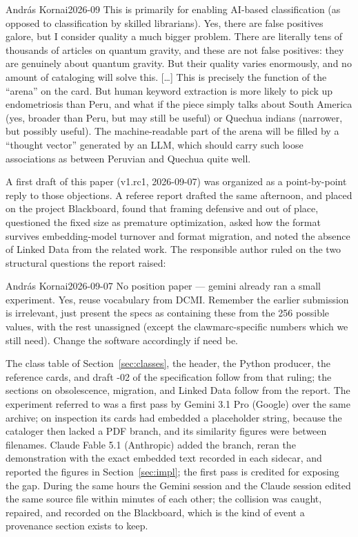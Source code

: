\documentclass[11pt]{article}
\begin{document}
\begin{seniorquote}{Andr\'as Kornai}{2026-09}
This is primarily for enabling AI-based classification (as opposed to
classification by skilled librarians). Yes, there are false positives galore,
but I consider quality a much bigger problem. There are literally tens of
thousands of articles on quantum gravity, and these are not false positives:
they are genuinely about quantum gravity. But their quality varies enormously,
and no amount of cataloging will solve this. [\dots] This is precisely the
function of the ``arena'' on the card. But human keyword extraction is more
likely to pick up endometriosis than Peru, and what if the piece simply talks
about South America (yes, broader than Peru, but may still be useful) or
Quechua indians (narrower, but possibly useful). The machine-readable part of
the arena will be filled by a ``thought vector'' generated by an LLM, which
should carry such loose associations as between Peruvian and Quechua quite
well.
\end{seniorquote}

\noindent
A first draft of this paper (v1.rc1, 2026-09-07) was organized as a
point-by-point reply to those objections. A referee report drafted the same
afternoon, and placed on the project Blackboard, found that framing defensive
and out of place, questioned the fixed size as premature optimization, asked
how the format survives embedding-model turnover and format migration, and
noted the absence of Linked Data from the related work. The responsible
author ruled on the two structural questions the report raised:

\begin{seniorquote}{Andr\'as Kornai}{2026-09-07}
No position paper --- gemini already ran a small experiment. Yes, reuse
vocabulary from DCMI. Remember the earlier submission is irrelevant, just
present the specs as containing these from the 256 possible values, with the
rest unassigned (except the clawmarc-specific numbers which we still need).
Change the software accordingly if need be.
\end{seniorquote}

\noindent
The class table of Section~\ref{sec:classes}, the header, the Python
producer, the reference cards, and draft -02 of the specification follow from
that ruling; the sections on obsolescence, migration, and Linked Data follow
from the report. The experiment referred to was a first pass by Gemini 3.1
Pro (Google) over the same archive; on inspection its cards had embedded a
placeholder string, because the cataloger then lacked a PDF branch, and its
similarity figures were between filenames. Claude Fable 5.1 (Anthropic) added
the branch, reran the demonstration with the exact embedded text recorded in
each sidecar, and reported the figures in Section~\ref{sec:impl}; the first
pass is credited for exposing the gap. During the same hours the Gemini
session and the Claude session edited the same source file within minutes of
each other; the collision was caught, repaired, and recorded on the
Blackboard, which is the kind of event a provenance section exists to keep.
\end{document}
